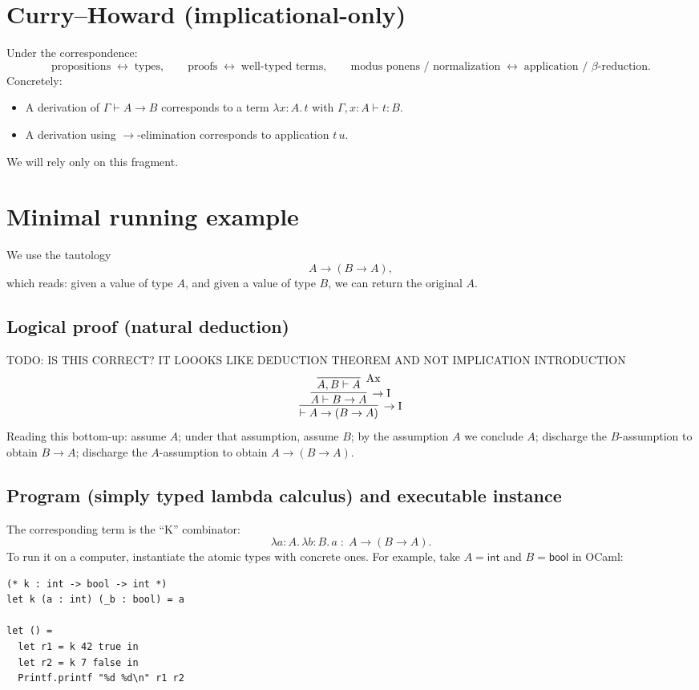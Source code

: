 \section{Curry--Howard (implicational-only)}
Under the correspondence:
\[
\text{propositions} \;\leftrightarrow\; \text{types}, \qquad
\text{proofs} \;\leftrightarrow\; \text{well-typed terms}, \qquad
\text{modus ponens / normalization} \;\leftrightarrow\; \text{application / $\beta$-reduction}.
\]
Concretely:
\begin{itemize}
  \item A derivation of $\Gamma \vdash A \to B$ corresponds to a term $\lambda x{:}A.\,t$ with $\Gamma, x{:}A \vdash t : B$.
  \item A derivation using $\to$-elimination corresponds to application $t\,u$.
\end{itemize}
We will rely only on this fragment.

\section{Minimal running example}
We use the tautology
\[
A \to (B \to A),
\]
which reads: given a value of type $A$, and given a value of type $B$, we can return the original $A$.

\subsection*{Logical proof (natural deduction)}
TODO: IS THIS CORRECT? IT LOOOKS LIKE DEDUCTION THEOREM AND NOT IMPLICATION INTRODUCTION
\[
\infer[\to\mathrm{I}]{\vdash A \to (B \to A)}{
  \infer[\to\mathrm{I}]{A \vdash B \to A}{
    \infer[\mathrm{Ax}]{A, B \vdash A}{}
  }
}
\]
Reading this bottom-up: assume $A$; under that assumption, assume $B$; by the assumption $A$ we conclude $A$; discharge the $B$-assumption to obtain $B \to A$; discharge the $A$-assumption to obtain $A \to (B \to A)$.

\subsection*{Program (simply typed lambda calculus) and executable instance}
The corresponding term is the ``K'' combinator:
\[
\lambda a{:}A.\,\lambda b{:}B.\, a \;:\; A \to (B \to A).
\]
To run it on a computer, instantiate the atomic types with concrete ones. For example, take $A = \mathsf{int}$ and $B = \mathsf{bool}$ in OCaml:

\begin{verbatim}
(* k : int -> bool -> int *)
let k (a : int) (_b : bool) = a

let () =
  let r1 = k 42 true in
  let r2 = k 7 false in
  Printf.printf "%d %d\n" r1 r2
\end{verbatim}

